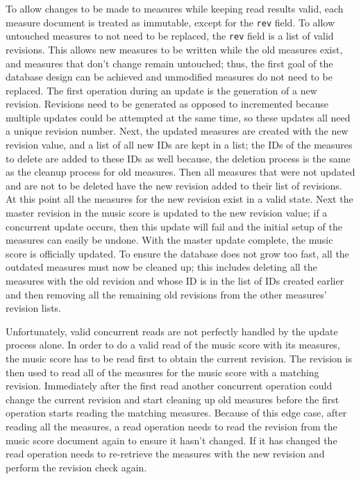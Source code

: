 \documentclass[letterpaper,12pt]{article}
\begin{document}
To allow changes to be made to measures while keeping read results valid, each measure document is treated as immutable,
except for the \lstinline{rev} field. To allow untouched measures to not need to be replaced, the \lstinline{rev} field
is a list of valid revisions. This allows new measures to be written while the old measures exist, and measures
that don't change remain untouched; thus, the first goal of the database design can be achieved and unmodified measures
do not need to be replaced. The first operation during an update is the generation of a new revision. Revisions need to
be generated as opposed to incremented because multiple updates could be attempted at the same time, so these updates
all need a unique revision number. Next, the updated measures are created with the new revision value, and a list of all
new IDs are kept in a list; the IDs of the measures to delete are added to these IDs as well because, the deletion
process is the same as the cleanup process for old measures. Then all measures that were not updated and are not to be
deleted have the new revision added to their list of revisions. At this point all the measures for the new revision
exist in a valid state. Next the master revision in the music score is updated to the new revision value; if a
concurrent update occurs, then this update will fail and the initial setup of the measures can easily be undone. With
the master update complete, the music score is officially updated. To ensure the database does not grow too fast, all
the outdated measures must now be cleaned up; this includes deleting all the measures with the old revision and whose ID
is in the list of IDs created earlier and then removing all the remaining old revisions from the other measures'
revision lists.

Unfortunately, valid concurrent reads are not perfectly handled by the update process alone. In order to do a valid read
of the music score with its measures, the music score has to be read first to obtain the current revision. The revision
is then used to read all of the measures for the music score with a matching revision. Immediately after the first read
another concurrent operation could change the current revision and start cleaning up old measures before the first
operation starts reading the matching measures. Because of this edge case, after reading all the measures, a read
operation needs to read the revision from the music score document again to ensure it hasn't changed. If it has changed
the read operation needs to re-retrieve the measures with the new revision and perform the revision check again.
\end{document}
